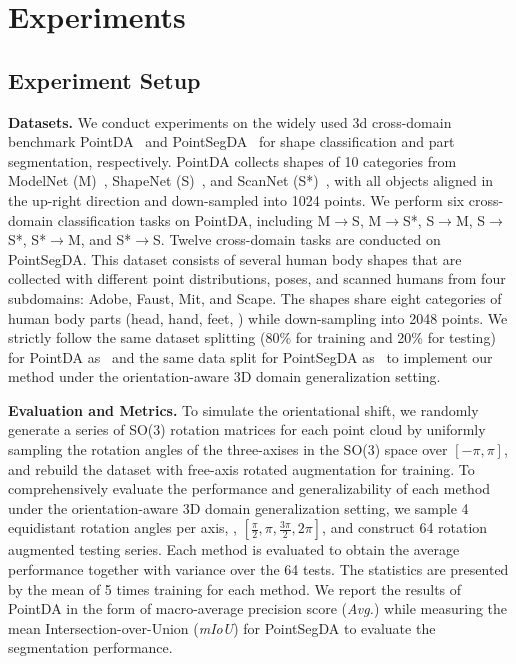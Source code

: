 \section{Experiments} \label{sec:experiment}




\subsection{Experiment Setup}


\textbf{Datasets.}
We conduct experiments on the widely used 3d cross-domain benchmark PointDA~\cite{qin2019pointdan} and PointSegDA~\cite{achituve2021self} for shape classification and part segmentation, respectively. PointDA collects shapes of 10 categories from ModelNet (M)~\cite{wu20153d}, ShapeNet (S)~\cite{chang2015shapenet}, and ScanNet (S*)~\cite{dai2017scannet}, with all objects aligned in the up-right direction and down-sampled into 1024 points. We perform six cross-domain classification tasks on PointDA, including {M$\to$S}, {M$\to$S*}, {S$\to$M}, {S$\to$S*}, {S*$\to$M}, and {S*$\to$S}. Twelve cross-domain tasks are conducted on PointSegDA. This dataset consists of several human body shapes that are collected with different point distributions, poses, and scanned humans from four subdomains: Adobe, Faust, Mit, and Scape. The shapes share eight categories of human body parts (head, hand, feet, \etc) while down-sampling into 2048 points.
We strictly follow the same dataset splitting (80\% for training and 20\% for testing) for PointDA as~\cite{qin2019pointdan} and the same data split for PointSegDA as~\cite{achituve2021self} to implement our method under the orientation-aware 3D domain generalization setting.



\noindent\textbf{Evaluation and Metrics.}
To simulate the orientational shift, we randomly generate a series of SO(3) rotation matrices for each point cloud by uniformly sampling the rotation angles of the three-axises in the SO(3) space over $\left[-\pi, \pi\right]$, and rebuild the dataset with free-axis rotated augmentation for training. To comprehensively evaluate the performance and generalizability of each method under the orientation-aware 3D domain generalization setting, we sample 4 equidistant rotation angles per axis, \ie, $[\frac{\pi}{2}, \pi, \frac{3\pi}{2}, 2\pi]$, and construct 64 rotation augmented testing series. Each method is evaluated to obtain the average performance together with variance over the 64 tests. The statistics are presented by the mean of 5 times training for each method. We report the results of PointDA in the form of macro-average precision score (\textit{Avg.}) while measuring the mean Intersection-over-Union (\textit{mIoU}) for PointSegDA to evaluate the segmentation performance.



